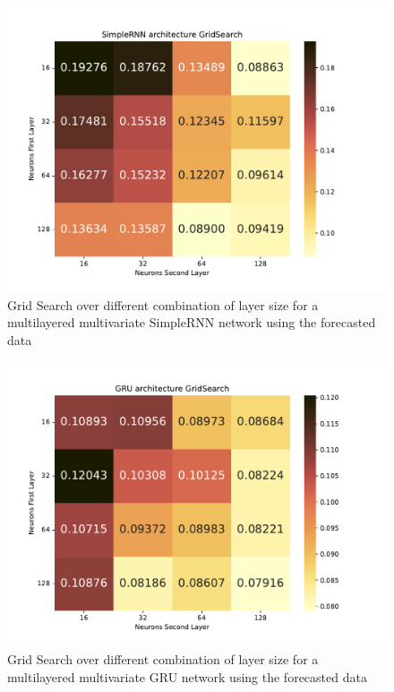 \documentclass
[twocolumn,
secnumarabic,
nobibnotes,
aps,
prl,
reprint,
groupedaddress,
amsmath,
amssymb,
]{revtex4-2}
\begin{document}
\begin{figure}
  \includegraphics[width=\columnwidth]{figures/Large_forecast_gridsearch_rnn.pdf}
  \caption{\label{fig_largegsrnn}Grid Search over different combination of layer size for a multilayered multivariate SimpleRNN network using the forecasted data}
\end{figure}

\begin{figure}
  \includegraphics[width=\columnwidth]{figures/Large_forecast_gridsearch_gru.pdf}
  \caption{\label{fig_largegsgru}Grid Search over different combination of layer size for a multilayered multivariate GRU network using the forecasted data}
\end{figure}
\end{document}
